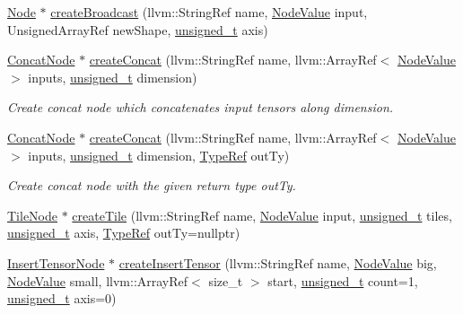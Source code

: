 \begin{DoxyCompactItemize}
\hyperlink{classglow_1_1_node}{Node} $\ast$ \hyperlink{classglow_1_1_function_a757d71d8785b075edcc6f0e9b9bc12ac}{create\+Broadcast} (llvm\+::\+String\+Ref name, \hyperlink{structglow_1_1_node_value}{Node\+Value} input, Unsigned\+Array\+Ref new\+Shape, \hyperlink{namespaceglow_a0ca574644e1e42ef193a9947fb4d8911}{unsigned\+\_\+t} axis)
\item 
\mbox{\label{classglow_1_1_function_af67b2d59133de2a5fa8d4858758841b0}} 
\hyperlink{classglow_1_1_concat_node}{Concat\+Node} $\ast$ \hyperlink{classglow_1_1_function_af67b2d59133de2a5fa8d4858758841b0}{create\+Concat} (llvm\+::\+String\+Ref name, llvm\+::\+Array\+Ref$<$ \hyperlink{structglow_1_1_node_value}{Node\+Value} $>$ inputs, \hyperlink{namespaceglow_a0ca574644e1e42ef193a9947fb4d8911}{unsigned\+\_\+t} dimension)
\begin{DoxyCompactList}\small\item\em Create concat node which concatenates input tensors along {\ttfamily dimension}. \end{DoxyCompactList}\item 
\mbox{\label{classglow_1_1_function_ac904da4288552dd4146ea199a04a072d}} 
\hyperlink{classglow_1_1_concat_node}{Concat\+Node} $\ast$ \hyperlink{classglow_1_1_function_ac904da4288552dd4146ea199a04a072d}{create\+Concat} (llvm\+::\+String\+Ref name, llvm\+::\+Array\+Ref$<$ \hyperlink{structglow_1_1_node_value}{Node\+Value} $>$ inputs, \hyperlink{namespaceglow_a0ca574644e1e42ef193a9947fb4d8911}{unsigned\+\_\+t} dimension, \hyperlink{structglow_1_1_type}{Type\+Ref} out\+Ty)
\begin{DoxyCompactList}\small\item\em Create concat node with the given return type {\ttfamily out\+Ty}. \end{DoxyCompactList}\item 
\hyperlink{classglow_1_1_tile_node}{Tile\+Node} $\ast$ \hyperlink{classglow_1_1_function_aea101a646a4e71c0b513608587127217}{create\+Tile} (llvm\+::\+String\+Ref name, \hyperlink{structglow_1_1_node_value}{Node\+Value} input, \hyperlink{namespaceglow_a0ca574644e1e42ef193a9947fb4d8911}{unsigned\+\_\+t} tiles, \hyperlink{namespaceglow_a0ca574644e1e42ef193a9947fb4d8911}{unsigned\+\_\+t} axis, \hyperlink{structglow_1_1_type}{Type\+Ref} out\+Ty=nullptr)
\item 
\hyperlink{classglow_1_1_insert_tensor_node}{Insert\+Tensor\+Node} $\ast$ \hyperlink{classglow_1_1_function_aeacd10cc5da0f12caa196897ce7a6141}{create\+Insert\+Tensor} (llvm\+::\+String\+Ref name, \hyperlink{structglow_1_1_node_value}{Node\+Value} big, \hyperlink{structglow_1_1_node_value}{Node\+Value} small, llvm\+::\+Array\+Ref$<$ size\+\_\+t $>$ start, \hyperlink{namespaceglow_a0ca574644e1e42ef193a9947fb4d8911}{unsigned\+\_\+t} count=1, \hyperlink{namespaceglow_a0ca574644e1e42ef193a9947fb4d8911}{unsigned\+\_\+t} axis=0)

\end{DoxyCompactItemize}

